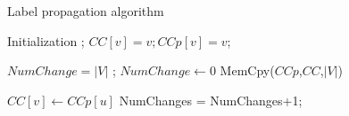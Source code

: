 \begin{algorithm}[!t]
\small
\caption{Label propagation algorithm}
\label{alg:SV_ALG}
\begin{algorithmic}[1]

\State Initialization ;
\State	$CC[v]=v; CCp[v]=v$;
\EndFor

\State $NumChange=|V|$
;
\State $NumChange\leftarrow 0$
\State MemCpy($CCp$,$CC$,$|V|$)

\State $CC[v]\leftarrow CCp[u]$
\State NumChanges = NumChanges+1;
\EndIf

\EndFor
\EndFor

\EndWhile 


\end{algorithmic}
\end{algorithm}
%